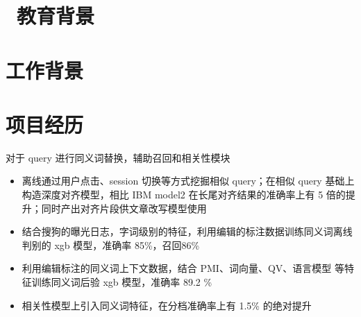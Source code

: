 \documentclass{resume}
\begin{document}




\section{\faGraduationCap\  教育背景}

\section{\faGraduationCap  工作背景}

\section{\faUsers 项目经历}

\begin{onehalfspacing}
对于 query 进行同义词替换，辅助召回和相关性模块
\begin{itemize}
  \item 离线通过用户点击、session 切换等方式挖掘相似 query；在相似 query 基础上构造深度对齐模型，相比 IBM model2 在长尾对齐结果的准确率上有 5 倍的提升；同时产出对齐片段供文章改写模型使用
  \item 结合搜狗的曝光日志，字词级别的特征，利用编辑的标注数据训练同义词离线判别的 xgb 模型，准确率 85\%，召回86\%
  \item 利用编辑标注的同义词上下文数据，结合 PMI、词向量、QV、语言模型 等特征训练同义词后验 xgb 模型，准确率 89.2 \%
  \item 相关性模型上引入同义词特征，在分档准确率上有 1.5\% 的绝对提升
\end{itemize}
\end{onehalfspacing}
\end{document}
